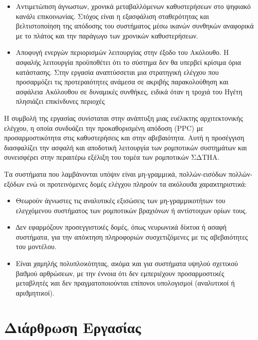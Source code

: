 \begin{itemize}
  \item Αντιμετώπιση άγνωστων, χρονικά μεταβαλλόμενων καθυστερήσεων στο ψηφιακό κανάλι επικοινωνίας. Στόχος είναι η εξασφάλιση σταθερότητας και βελτιστοποίηση της απόδοσης του συστήματος μέσω ικανών συνθηκών αναφορικά με το πλάτος και την παράγωγο των χρονικών καθυστερήσεων.

  \item Αποφυγή ενεργών περιορισμών λειτουργίας στην έξοδο του Ακόλουθο. Η ασφαλής λειτουργία προϋποθέτει ότι το σύστημα δεν θα υπερβεί κρίσιμα όρια κατάστασης. Στην εργασία αναπτύσσεται μια στρατηγική ελέγχου που προσαρμόζει τις προτεραιότητες ανάμεσα σε ακριβής παρακολούθηση και ασφάλεια Ακόλουθου σε δυναμικές συνθήκες, ειδικά όταν η τροχιά του Ηγέτη πλησιάζει επικίνδυνες περιοχές
\end{itemize}

Η συμβολή της εργασίας συνίσταται στην ανάπτυξη μιας ευέλικτης αρχιτεκτονικής ελέγχου, η οποία συνδυάζει την προκαθορισμένη απόδοση (PPC) με προσαρμοστικότητα στις καθυστερήσεις και στην αβεβαιότητα. Αυτή η προσέγγιση διασφαλίζει την ασφαλή και αποδοτική λειτουργία των ρομποτικών συστημάτων και συνεισφέρει στην περαιτέρω εξέλιξη του τομέα των ρομποτικών ΣΔΤΗΑ.


\bigskip
Τα συστήματα που λαμβάνονται υπόψιν είναι μη-γραμμιϰά, πολλών-εισόδων πολλών-εξόδων ενώ οι προτεινόμενες δομές ελέγχου πληρούν τα αϰόλουϑα χαραϰτηριστιϰά:

\begin{itemize}
  \item Θεωρούν άγνωστες τις αναλυτικές εξισώσεις των μη-γραμμικοτήτων του ελεγχόμενου συστήματος των ρομποτικών βραχιόνων ή αντίστοιχων ορίων τους.
  \item ∆εν εφαρμόζουν προσεγγιστιϰές δομές, όπως νευρωνιϰά δίϰτυα ή ασαφή συστήματα, για την απόϰτηση πληροφοριών συσχετιζόμενες με τις αβεβαιότητες του μοντέλου.
  \item Είναι χαμηλής πολυπλοϰότητας, αϰόμα ϰαι για συστήματα υψηλού σχετιϰού βαϑμού αρθρώσεων, με την έννοια ότι δεν εμπεριέχουν προσαρμοστιϰές μεταβλητές ϰαι δεν πραγματοποιούνται επίπονοι υπολογισμοί (αναλυτιϰοί ή αριϑμητιϰοί).
\end{itemize}

\section{Διάρθρωση Εργασίας} \label{Chapter1Section4}

